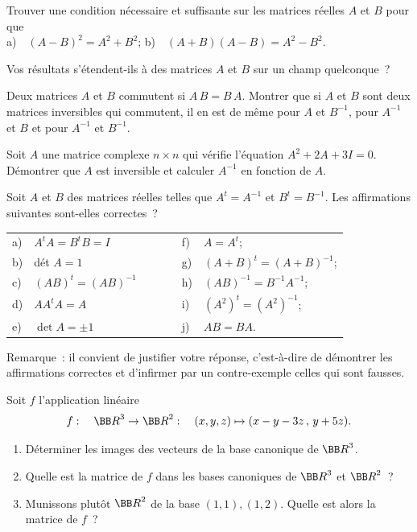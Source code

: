 \documentclass[12pt,french,oneside,a4paper]{memoir} %
\begin{document}
\begin{exo}
Trouver une condition nécessaire et suffisante sur les matrices réelles $A$ et $B$ pour que\\
\hspace*{20mm} a)~~$(A-B)^2=A^2+B^2$; \hspace{20mm} b)~~$(A+B)(A-B)=A^2-B^2$.

\noindent Vos résultats s'étendent-ils à des matrices $A$ et $B$ sur un champ quelconque~?
\end{exo}
\begin{exo}
Deux matrices $A$ et $B$ commutent si $A\,B=B\,A$.  Montrer que si $A$ et $B$ sont deux matrices inversibles qui commutent, il en est de même pour $A$ et $B^{-1}$, pour $A^{-1}$ et $B$ et pour $A^{-1}$ et $B^{-1}$.
\end{exo}
\begin{exo}
Soit $A$ une matrice complexe $n \times n$ qui vérifie l'équation $A^2+2A+3I=0$. 
Démontrer que $A$ est inversible et calculer $A^{-1}$ en fonction de $A$.
\end{exo}
\begin{exo}
Soit $A$ et $B$ des matrices réelles telles que $A^t=A^{-1}$ et 
$B^t=B^{-1}$. Les affirmations suivantes sont-elles correctes~?

\vspace{2mm}

\noindent\hspace*{15mm}
\begin{tabular}{lllll}
a) &$A ^tA=B ^tB=I$ &$\qquad$ &f) &$A=A^t$; \\
b) &dét $A=1$ & &g) &$(A+B)^t=(A+B)^{-1}$; \\
c) &$(AB)^t=(AB)^{-1}$ & &h) &$(AB)^{-1}=B^{-1}A^{-1}$; \\
d) &$A A^t A=A$ & &i) &$(A^2)^t=(A^2)^{-1}$; \\
e) &$\det A= \pm 1$ & &j) &$AB=BA$.
\end{tabular}

\vspace{1mm}

\noindent
Remarque~: il convient de justifier votre réponse, c'est-à-dire de démontrer les affirmations correctes et d'infirmer par un contre-exemple celles qui sont fausses.
\end{exo}
\begin{exo}
Soit $f$ l'application linéaire
\begin{equation*}
f :\quad {\BB R}^3 \rightarrow {\BB R}^2 :\quad (x,y,z) \mapsto (x-y-3z \, , \, y+5z). 
\end{equation*}
\begin{enumerate}
\item Déterminer les images des vecteurs de la base canonique de ${\BB R}^3$. 
\item Quelle est la matrice de $f$ dans les bases canoniques de 
${\BB R}^3$ et ${\BB R}^2$~?
\item Munissons plutôt ${\BB R}^2$ de la base $(1,1), (1,2)$. 
Quelle est alors la matrice de $f$~?
\end{enumerate}
\end{exo}
\end{document}
